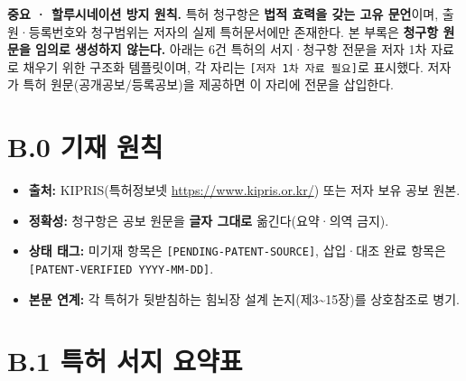 \documentclass[12pt,oneside]{book}
\newenvironment{authnote}
  {\par\smallskip\begingroup\leftskip=6mm\rightskip=3mm\small\color{muted}\noindent\ignorespaces}
  {\par\endgroup\smallskip}
\begin{document}
\begin{authnote}\textbf{중요 · 할루시네이션 방지 원칙.} 특허 청구항은 \textbf{법적 효력을 갖는 고유 문언}이며, 출원·등록번호와 청구범위는 저자의 실제 특허문서에만 존재한다. 본 부록은 \textbf{청구항 원문을 임의로 생성하지 않는다.} 아래는 6건 특허의 서지·청구항 전문을 저자 1차 자료로 채우기 위한 구조화 템플릿이며, 각 자리는 \texttt{[저자 1차 자료 필요]}로 표시했다. 저자가 특허 원문(공개공보/등록공보)을 제공하면 이 자리에 전문을 삽입한다.\end{authnote}

\section{B.0 기재 원칙}

\begin{itemize}[leftmargin=6mm,itemsep=1pt,topsep=2pt]
  \item \textbf{출처:} KIPRIS(특허정보넷 \url{https://www.kipris.or.kr/}) 또는 저자 보유 공보 원본.
  \item \textbf{정확성:} 청구항은 공보 원문을 \textbf{글자 그대로} 옮긴다(요약·의역 금지).
  \item \textbf{상태 태그:} 미기재 항목은 \texttt{[PENDING-PATENT-SOURCE]}, 삽입·대조 완료 항목은 \texttt{[PATENT-VERIFIED YYYY-MM-DD]}.
  \item \textbf{본문 연계:} 각 특허가 뒷받침하는 힘뇌장 설계 논지(제3\textasciitilde{}15장)를 상호참조로 병기.
\end{itemize}

\section{B.1 특허 서지 요약표}

\vspace{2pt}\vspace{3pt}
\end{document}
